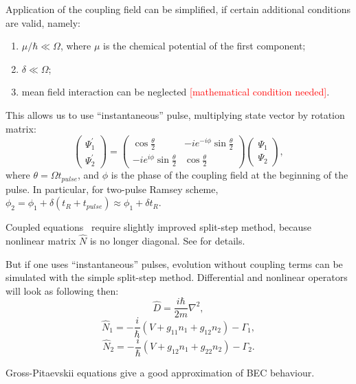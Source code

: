 Application of the coupling field can be simplified, if certain additional conditions are valid, namely:
\begin{enumerate}
	\item $\mu / \hbar \ll \Omega$, where $\mu$ is the chemical potential of the first component;
	\item $\delta \ll \Omega$;
	\item mean field interaction can be neglected \textcolor{red}{[mathematical condition needed]}.
\end{enumerate}
This allows us to use ``instantaneous'' pulse, multiplying state vector by rotation matrix:
\begin{equation}
\label{eqn:mean-field:rotation-matrix}
	\begin{pmatrix}
		\Psi^\prime_1 \\ \Psi^\prime_2
	\end{pmatrix} =
	\begin{pmatrix}
		\cos \frac{\theta}{2} & -i e^{-i \phi} \sin \frac{\theta}{2} \\
		-i e^{i \phi} \sin \frac{\theta}{2} & \cos \frac{\theta}{2}
	\end{pmatrix}
	\begin{pmatrix}
		\Psi_1 \\ \Psi_2
	\end{pmatrix},
\end{equation}
where $\theta = \Omega t_{pulse}$, and $\phi$ is the phase of the coupling field at the beginning of the pulse.
In particular, for two-pulse Ramsey scheme, $\phi_2 = \phi_1 + \delta (t_{R} + t_{pulse}) \approx \phi_1 + \delta t_{R}$.

Coupled equations~ require slightly improved split-step method,
because nonlinear matrix $\hat{N}$ is no longer diagonal.
See  for details.

But if one uses ``instantaneous'' pulses, evolution without coupling terms can be simulated with the simple split-step method.
Differential and nonlinear operators will look as following then:
\[
	\hat{D} = \frac{i \hbar}{2m} \nabla^2,
\]
\[
	\hat{N}_1 = -\frac{i}{\hbar} \left( V + g_{11} n_1 + g_{12} n_2 \right) - \Gamma_1,
\]
\[
	\hat{N}_2 = -\frac{i}{\hbar} \left( V + g_{12} n_1 + g_{22} n_2 \right) - \Gamma_2.
\]

Gross-Pitaevskii equations give a good approximation of BEC behaviour.
